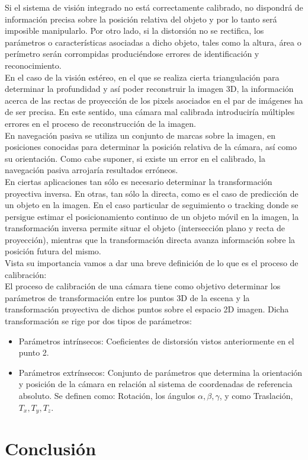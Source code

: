 \documentclass[a4,10pt]{article}
\begin{document}
\begin{enumerate}
Si el sistema de visión integrado no está correctamente calibrado, no dispondrá de información precisa sobre la posición relativa del objeto y por lo tanto será imposible manipularlo. Por otro lado, si la distorsión no se rectifica, los parámetros o características asociadas a dicho objeto, tales como la altura, área o perímetro serán corrompidas produciéndose errores de identificación y reconocimiento.\\
En el caso de la visión estéreo, en el que se realiza cierta triangulación para determinar la profundidad y así poder reconstruir la imagen 3D, la información acerca de las rectas de proyección de los pixels asociados en el par de imágenes ha de ser precisa. En este sentido, una cámara mal calibrada introduciría múltiples errores en el proceso de reconstrucción de la imagen.\\
En navegación pasiva se utiliza un conjunto de marcas sobre la imagen, en posiciones conocidas para determinar la posición relativa de la cámara, así como su orientación. Como cabe suponer, si existe un error en el calibrado, la navegación pasiva arrojaría resultados erróneos.\\
En ciertas aplicaciones tan sólo es necesario determinar la transformación proyectiva inversa. En otras, tan sólo la directa, como es el caso de predicción de un objeto en la imagen. En el caso particular de seguimiento o tracking donde se persigue estimar el posicionamiento continuo de un objeto móvil en la imagen, la transformación inversa permite situar el objeto (intersección plano y recta de proyección), mientras que la transformación directa avanza información sobre la posición futura del mismo.\\
Vista su importancia vamos a dar una breve definición de lo que es el proceso de calibración:\\
El proceso de calibración de una cámara tiene como objetivo determinar los parámetros de transformación entre los puntos 3D de la escena y la transformación proyectiva de dichos puntos sobre el espacio 2D imagen. Dicha transformación se rige por dos tipos de parámetros:%
\begin {itemize}
\item Parámetros intrínsecos: Coeficientes de distorsión vistos anteriormente en el punto 2.
\item Parámetros extrínsecos: Conjunto de parámetros que determina la orientación y posición de la cámara en relación al sistema de coordenadas de referencia absoluto. Se definen como: Rotación, los ángulos $ \alpha ,\beta, \gamma$, y como Traslación, $ T_x, T_y, T_z $.
\end {itemize}

\end {enumerate}


\section{Conclusión}






\end{document}
